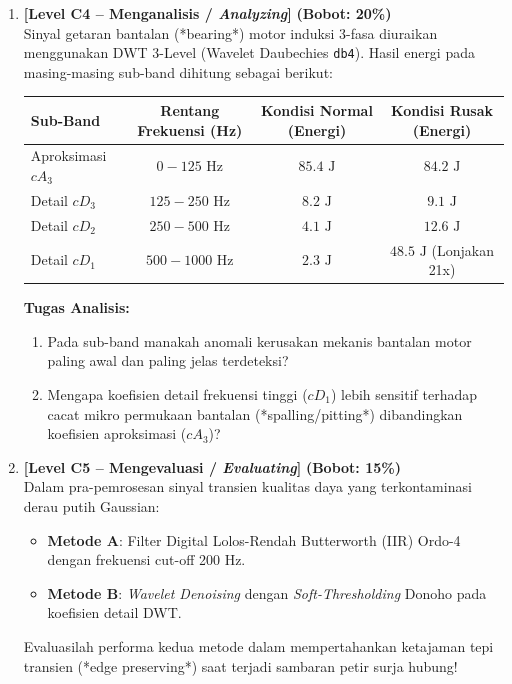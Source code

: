 \documentclass[11pt,a4paper]{article}
\begin{document}
\begin{enumerate}[leftmargin=1.5em, label=\textbf{Soal \arabic*.}]
    \newpage

    \item \textbf{[Level C4 -- Menganalisis / \textit{Analyzing}]} \hfill \textbf{(Bobot: 20\%)} \\
    Sinyal getaran bantalan (*bearing*) motor induksi 3-fasa diuraikan menggunakan DWT 3-Level (Wavelet Daubechies \texttt{db4}). Hasil energi pada masing-masing sub-band dihitung sebagai berikut:
    \begin{center}
    \begin{tabular}{|l|c|c|c|}
    \hline
    \rowcolor{boxbg}
    \textbf{Sub-Band} & \textbf{Rentang Frekuensi (Hz)} & \textbf{Kondisi Normal (Energi)} & \textbf{Kondisi Rusak (Energi)} \\ \hline
    Aproksimasi $cA_3$ & $0 - 125$ Hz & $85.4 \text{ J}$ & $84.2 \text{ J}$ \\ \hline
    Detail $cD_3$ & $125 - 250$ Hz & $8.2 \text{ J}$ & $9.1 \text{ J}$ \\ \hline
    Detail $cD_2$ & $250 - 500$ Hz & $4.1 \text{ J}$ & $12.6 \text{ J}$ \\ \hline
    Detail $cD_1$ & $500 - 1000$ Hz & $2.3 \text{ J}$ & $48.5 \text{ J}$ (Lonjakan 21x) \\ \hline
    \end{tabular}
    \end{center}
    \textbf{Tugas Analisis:}
    \begin{enumerate}[label=\alph*.]
        \item Pada sub-band manakah anomali kerusakan mekanis bantalan motor paling awal dan paling jelas terdeteksi?
        \item Mengapa koefisien detail frekuensi tinggi ($cD_1$) lebih sensitif terhadap cacat mikro permukaan bantalan (*spalling/pitting*) dibandingkan koefisien aproksimasi ($cA_3$)?
    \end{enumerate}

    \vspace{0.4cm}

    \item \textbf{[Level C5 -- Mengevaluasi / \textit{Evaluating}]} \hfill \textbf{(Bobot: 15\%)} \\
    Dalam pra-pemrosesan sinyal transien kualitas daya yang terkontaminasi derau putih Gaussian:
    \begin{itemize}
        \item \textbf{Metode A}: Filter Digital Lolos-Rendah Butterworth (IIR) Ordo-4 dengan frekuensi cut-off 200 Hz.
        \item \textbf{Metode B}: \textit{Wavelet Denoising} dengan \textit{Soft-Thresholding} Donoho pada koefisien detail DWT.
    \end{itemize}
    Evaluasilah performa kedua metode dalam mempertahankan ketajaman tepi transien (*edge preserving*) saat terjadi sambaran petir surja hubung!


\end{enumerate}
\end{document}
